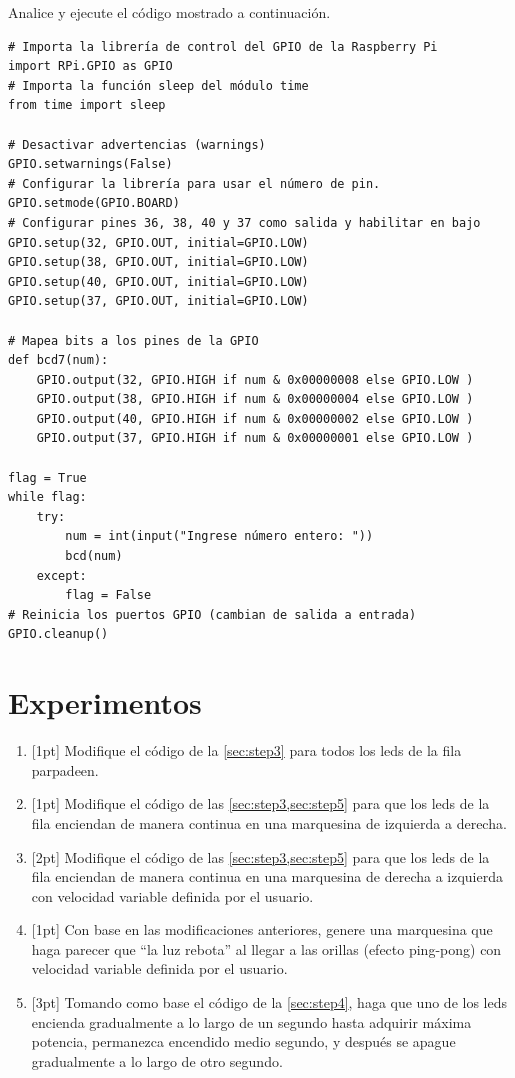 \documentclass[letterpaper,10.5pt]{article}
\begin{document}
Analice y ejecute el código mostrado a continuación.
\medskip
\begin{lstlisting}
# Importa la librería de control del GPIO de la Raspberry Pi
import RPi.GPIO as GPIO
# Importa la función sleep del módulo time
from time import sleep

# Desactivar advertencias (warnings)
GPIO.setwarnings(False)
# Configurar la librería para usar el número de pin.
GPIO.setmode(GPIO.BOARD)
# Configurar pines 36, 38, 40 y 37 como salida y habilitar en bajo
GPIO.setup(32, GPIO.OUT, initial=GPIO.LOW)
GPIO.setup(38, GPIO.OUT, initial=GPIO.LOW)
GPIO.setup(40, GPIO.OUT, initial=GPIO.LOW)
GPIO.setup(37, GPIO.OUT, initial=GPIO.LOW)

# Mapea bits a los pines de la GPIO
def bcd7(num):
	GPIO.output(32, GPIO.HIGH if num & 0x00000008 else GPIO.LOW )
	GPIO.output(38, GPIO.HIGH if num & 0x00000004 else GPIO.LOW )
	GPIO.output(40, GPIO.HIGH if num & 0x00000002 else GPIO.LOW )
	GPIO.output(37, GPIO.HIGH if num & 0x00000001 else GPIO.LOW )

flag = True
while flag:
	try:
		num = int(input("Ingrese número entero: "))
		bcd(num)
	except:
		flag = False
# Reinicia los puertos GPIO (cambian de salida a entrada)
GPIO.cleanup()
\end{lstlisting}

%
%
\section{Experimentos}%
\label{sec:experiments}

\begin{enumerate}
	\item{} [1pt] Modifique el código de la \cref{sec:step3} para todos los leds de la fila parpadeen.
	\item{} [1pt] Modifique el código de las \cref{sec:step3,sec:step5} para que los leds de la fila enciendan de manera continua en una marquesina de izquierda a derecha.
	\item{} [2pt] Modifique el código de las \cref{sec:step3,sec:step5} para que los leds de la fila enciendan de manera continua en una marquesina de derecha a izquierda con velocidad variable definida por el usuario.
	\item{} [1pt] Con base en las modificaciones anteriores, genere una marquesina que haga parecer que \enquote{la luz rebota} al llegar a las orillas (efecto ping-pong) con velocidad variable definida por el usuario.
	\item{} [3pt] Tomando como base el código de la \cref{sec:step4}, haga que uno de los leds encienda gradualmente a lo largo de un segundo hasta adquirir máxima potencia, permanezca encendido medio segundo, y después se apague gradualmente a lo largo de otro segundo.
\end{enumerate}
\end{document}
